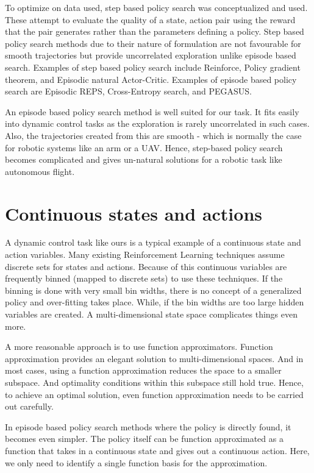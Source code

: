 \documentclass[hidelinks,BTech]{iitmdiss}
\begin{document}
To optimize on data used, step based policy search was conceptualized and used. These attempt to evaluate the quality of a state, action pair using the reward that the pair generates rather than the parameters defining a policy. Step based policy search methods due to their nature of formulation are not favourable for smooth trajectories but provide uncorrelated exploration unlike episode based search. Examples of step based policy search include Reinforce, Policy gradient theorem, and Episodic natural Actor-Critic. Examples of episode based policy search are Episodic REPS, Cross-Entropy search, and PEGASUS.

An episode based policy search method is well suited for our task. It fits easily into dynamic control tasks as the exploration is rarely uncorrelated in such cases. Also, the trajectories created from this are smooth - which is normally the case for robotic systems like an arm or a UAV. Hence, step-based policy search becomes complicated and gives un-natural solutions for a robotic task like autonomous flight.

\section{Continuous states and actions}

A dynamic control task like ours is a typical example of a continuous state and action variables. Many existing Reinforcement Learning techniques assume discrete sets for states and actions. Because of this continuous variables are frequently binned (mapped to discrete sets) to use these techniques. If the binning is done with very small bin widths, there is no concept of a generalized policy and over-fitting takes place. While, if the bin widths are too large hidden variables are created. A multi-dimensional state space complicates things even more.

A more reasonable approach is to use function approximators. Function approximation provides an elegant solution to multi-dimensional spaces. And in most cases, using a function approximation reduces the space to a smaller subspace. And optimality conditions within this subspace still hold true. Hence, to achieve an optimal solution, even function approximation needs to be carried out carefully.

In episode based policy search methods where the policy is directly found, it becomes even simpler. The policy itself can be function approximated as a function that takes in a continuous state and gives out a continuous action. Here, we only need to identify a single function basis for the approximation.
\end{document}
